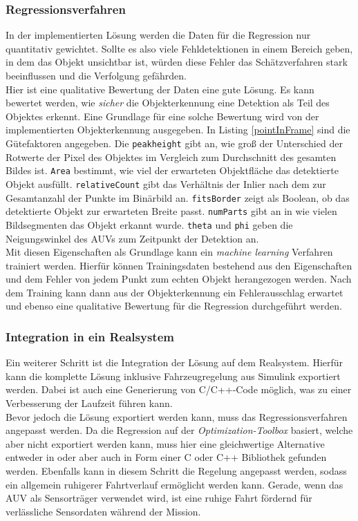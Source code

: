 \subsubsection{Regressionsverfahren}
\label{sec_learnWeights}
In der implementierten Lösung werden die Daten für die Regression nur quantitativ gewichtet. Sollte es also viele Fehldetektionen in einem Bereich geben, in dem das Objekt unsichtbar ist, würden diese Fehler das Schätzverfahren stark beeinflussen und die Verfolgung gefährden.\\
Hier ist eine qualitative Bewertung der Daten eine gute Lösung. Es kann bewertet werden, wie \textit{sicher} die Objekterkennung eine Detektion als Teil des Objektes erkennt. Eine Grundlage für eine solche Bewertung wird von der implementierten Objekterkennung ausgegeben. In Listing \ref{pointInFrame} sind die Gütefaktoren angegeben. Die \texttt{peakheight} gibt an, wie groß der Unterschied der Rotwerte der Pixel des Objektes im Vergleich zum Durchschnitt des gesamten Bildes ist. \texttt{Area} bestimmt, wie viel der erwarteten Objektfläche das detektierte Objekt ausfüllt. \texttt{relativeCount} gibt das Verhältnis der Inlier nach dem \rans zur Gesamtanzahl der Punkte im Binärbild an. \texttt{fitsBorder} zeigt als Boolean, ob das detektierte Objekt zur erwarteten Breite passt. \texttt{numParts} gibt an in wie vielen Bildsegmenten das Objekt erkannt wurde. \texttt{theta} und \texttt{phi} geben die Neigungswinkel des AUVs zum Zeitpunkt der Detektion an.\\
Mit diesen Eigenschaften als Grundlage kann ein \textit{machine learning} Verfahren trainiert werden. Hierfür können Trainingsdaten bestehend aus den Eigenschaften und dem Fehler von jedem Punkt zum echten Objekt herangezogen werden. Nach dem Training kann dann aus der Objekterkennung ein Fehlerausschlag erwartet und ebenso eine qualitative Bewertung für die Regression durchgeführt werden. 

\subsubsection{Integration in ein Realsystem}
\label{sec_real}
Ein weiterer Schritt ist die Integration der Lösung auf dem Realsystem. Hierfür kann die komplette Lösung inklusive Fahrzeugregelung aus Simulink exportiert werden. Dabei ist auch eine Generierung von C/C++-Code möglich, was zu einer Verbesserung der Laufzeit führen kann.\\
Bevor jedoch die Lösung exportiert werden kann, muss das Regressionsverfahren angepasst werden. Da die Regression auf der \textit{Optimization-Toolbox} basiert, welche aber nicht exportiert werden kann, muss hier eine gleichwertige Alternative entweder in \matlab oder aber auch in Form einer C oder C++ Bibliothek gefunden werden.
Ebenfalls kann in diesem Schritt die Regelung angepasst werden, sodass ein allgemein ruhigerer Fahrtverlauf ermöglicht werden kann. Gerade, wenn das AUV als Sensorträger verwendet wird, ist eine ruhige Fahrt fördernd für verlässliche Sensordaten während der Mission.